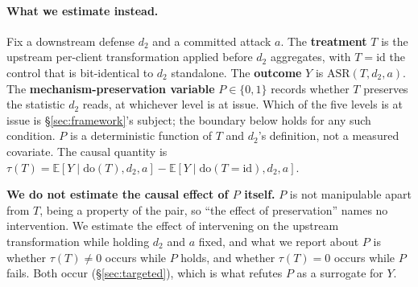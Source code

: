 \documentclass{article}
\begin{document}
\paragraph{What we estimate instead.} Fix a downstream defense $d_2$ and a committed attack $a$. The \textbf{treatment} $T$ is the upstream per-client transformation applied before $d_2$ aggregates, with $T{=}\mathrm{id}$ the control that is bit-identical to $d_2$ standalone. The \textbf{outcome} $Y$ is $\mathrm{ASR}(T,d_2,a)$. The \textbf{mechanism-preservation variable} $P\in\{0,1\}$ records whether $T$ preserves the statistic $d_2$ reads, at whichever level is at issue. Which of the five levels is at issue is §\ref{sec:framework}'s subject; the boundary below holds for any such condition. $P$ is a deterministic function of $T$ and $d_2$'s definition, not a measured covariate. The causal quantity is $\tau(T)=\mathbb{E}[Y\mid\mathrm{do}(T),d_2,a]-\mathbb{E}[Y\mid\mathrm{do}(T{=}\mathrm{id}),d_2,a]$.

\textbf{We do not estimate the causal effect of $P$ itself.} $P$ is not manipulable apart from $T$, being a property of the pair, so ``the effect of preservation'' names no intervention. We estimate the effect of intervening on the upstream transformation while holding $d_2$ and $a$ fixed, and what we report about $P$ is whether $\tau(T)\neq 0$ occurs while $P$ holds, and whether $\tau(T){=}0$ occurs while $P$ fails. Both occur (§\ref{sec:targeted}), which is what refutes $P$ as a surrogate for $Y$.


\end{document}
